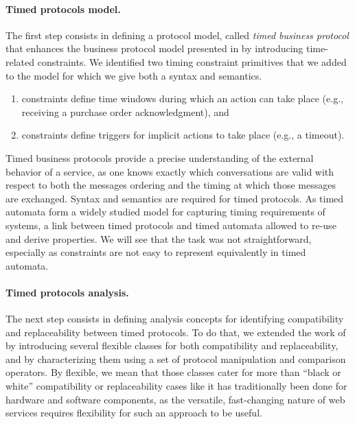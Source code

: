 \paragraph{Timed protocols model.}
The first step consists in defining a protocol model, called \emph{timed business protocol} that enhances the business protocol model presented in \cite{BBFC04,BBFC04b,FTBB} by introducing time-related constraints.
We identified two timing constraint primitives that we added to the model for which we give both a syntax and semantics.
\begin{enumerate}

	\item \CInvoke constraints define time windows during which an action can take place (e.g., receiving a purchase order acknowledgment), and
	
	\item \MInvoke constraints define triggers for implicit actions to take place (e.g., a timeout).

\end{enumerate}
Timed business protocols provide a precise understanding of the external behavior of a service, as one knows exactly which conversations are valid with respect to both the messages ordering and the timing at which those messages are exchanged. Syntax and semantics are required for timed protocols. As timed automata \cite{RADLD94} form a widely studied model for capturing timing requirements of systems, a link between timed protocols and timed automata allowed to re-use and derive properties. We will see that the task was not straightforward, especially as \MInvoke constraints are not easy to represent equivalently in timed automata.

\paragraph{Timed protocols analysis.}
The next step consists in defining analysis concepts for identifying compatibility and replaceability between timed protocols. To do that, we extended the work of \cite{FTBB} by introducing several flexible classes for both compatibility and replaceability, and by characterizing them using a set of protocol manipulation and comparison operators. By flexible, we mean that those classes cater for more than ``black or white'' compatibility or replaceability cases like it has traditionally been done for hardware and software components, as the versatile, fast-changing nature of web services requires flexibility for such an approach to be useful.

